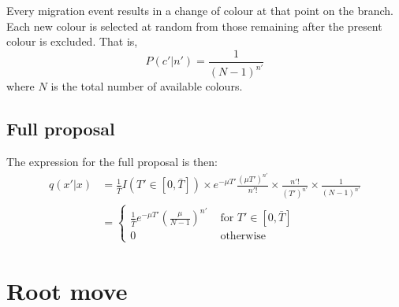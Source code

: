 \documentclass[a4paper,11pt]{article}
\begin{document}
Every migration event results in a change of colour at that point on
the branch.  Each new colour is selected at random from those
remaining after the present colour is excluded. That is,
\begin{equation}
  P(c'|n') = \frac{1}{(N-1)^{n'}}
\end{equation}
where $N$ is the total number of available colours.

\subsection{Full proposal}

The expression for the full proposal is then:
\begin{align}
  q(x'|x) &=\frac{1}{\bar{T}}I(T'\in[0,\bar{T}])
  \times e^{-\mu T'}\frac{(\mu T')^{n'}}{n'!}
  \times \frac{n'!}{(T')^{n'}}
  \times \frac{1}{(N-1)^{n'}}\nonumber\\
&=\left\{\begin{array}{rl}
    \frac{1}{\bar{T}}e^{-\mu T'}\left(\frac{\mu}{N-1}\right)^{n'} &
    \text{ for }T'\in[0,\bar{T}]\\
    0 & \text{ otherwise}
    \end{array}\right.
\end{align}

\section{Root move}
\end{document}
